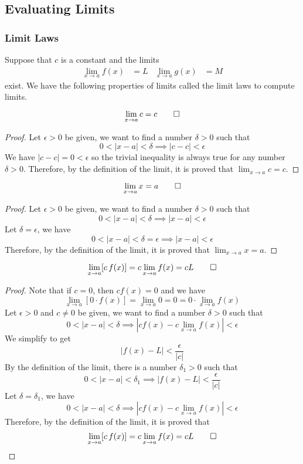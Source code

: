 \subsection{Evaluating Limits}

\subsubsection{Limit Laws}
Suppose that \(c\) is a constant and the limits
\begin{align*}
    \lim_{x\to a}f(x) &= L & \lim_{x\to a}g(x) &= M
\end{align*}
exist.
We have the following properties of limits called the limit laws to compute
limits.
\begin{theorem}
    \[\lim_{x\to a}c=c\qedhere\]
\end{theorem}
\begin{proof}
    Let \(\epsilon>0\) be given, we want to find a number \(\delta>0\) such
    that
    \[0<|x-a|<\delta\implies|c-c|<\epsilon\]
    We have \(|c-c|=0<\epsilon\) so the trivial inequality is always true for
    any number \(\delta>0\).
    Therefore, by the definition of the limit, it is proved that
    \(\lim_{x\to a}c=c\).
\end{proof}
\begin{theorem}
    \[\lim_{x\to a}x=a\qedhere\]
\end{theorem}
\begin{proof}
    Let \(\epsilon>0\) be given, we want to find a number \(\delta>0\) such
    that \[0<|x-a|<\delta\implies|x-a|<\epsilon\]
    Let \(\delta=\epsilon\), we have
    \[0<|x-a|<\delta=\epsilon\implies|x-a|<\epsilon\]
    Therefore, by the definition of the limit, it is proved that
    \(\lim_{x\to a}x=a\).
\end{proof}
\begin{theorem}
    \[\lim_{x\to a}[c\,f(x)]=c\lim_{x\to a}f(x)=cL\qedhere\]
\end{theorem}
\begin{proof}
    Note that if \(c=0\), then \(cf(x)=0\) and we have
    \[\lim_{x\to a}[0\cdot f(x)]=\lim_{x\to a}0=0=0\cdot\lim_{x\to a}f(x)\]
    Let \(\epsilon>0\) and \(c\neq0\) be given, we want to find a number
    \(\delta>0\) such that
    \[0<|x-a|<\delta\implies|cf(x)-c\lim_{x\to a}f(x)|<\epsilon\]
    We simplify to get
    \[|f(x)-L|<\frac{\epsilon}{|c|}\]
    By the definition of the limit, there is a number \(\delta_1>0\) such that
    \[0<|x-a|<\delta_1\implies|f(x)-L|<\frac{\epsilon}{|c|}\]
    Let \(\delta=\delta_1\), we have
    \[0<|x-a|<\delta\implies|cf(x)-c\lim_{x\to a}f(x)|<\epsilon\]
    Therefore, by the definition of the limit, it is proved that
    \[\lim_{x\to a}[c\,f(x)]=c\lim_{x\to a}f(x)=cL\qedhere\]
\end{proof}
